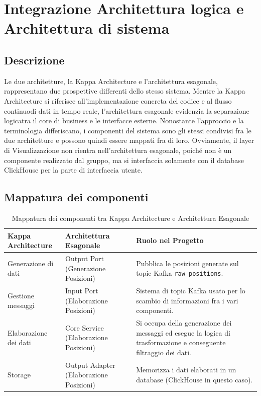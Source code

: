 \documentclass[10pt]{article}
\begin{document}
\section{Integrazione Architettura logica e Architettura di sistema}
\subsection{Descrizione}
Le due architetture, la Kappa Architecture e l'architettura esagonale, rappresentano due prospettive differenti dello stesso sistema.
Mentre la Kappa Architecture si riferisce all’implementazione concreta del codice e al flusso continuodi dati in tempo reale, l’architettura esagonale evidenzia la separazione logicatra il core di business e le interfacce esterne.
Nonostante l'approccio e la terminologia differiscano, i componenti  del sistema sono gli stessi condivisi fra le due architetture e possono quindi essere mappati fra di loro.
Ovviamente, il layer di Visualizzazione non rientra nell'architettura esagonale, poiché non è un componente realizzato dal gruppo, ma si interfaccia solamente con il database ClickHouse per la parte di interfaccia utente.
\subsection{Mappatura dei componenti}

\begin{table}[H]
\centering
\renewcommand{\arraystretch}{1.5}
\begin{tabular}{|>{\centering\arraybackslash}m{4cm}|>{\centering\arraybackslash}m{4cm}|>{\raggedright\arraybackslash}m{6cm}|}
\hline
\rowcolor{gray!25}
\textbf{Kappa Architecture} & \textbf{Architettura Esagonale} & \textbf{Ruolo nel Progetto} \\
\hline
Generazione di dati & Output Port (Generazione Posizioni) & Pubblica le posizioni generate sul topic Kafka \texttt{raw\_positions}. \\
\hline
Gestione messaggi & Input Port (Elaborazione Posizioni) & Sistema di topic Kafka usato per lo scambio di informazioni fra i vari componenti. \\
\hline
Elaborazione dei dati & Core Service (Elaborazione Posizioni) & Si occupa della generazione dei messaggi ed esegue la logica di trasformazione e conseguente filtraggio dei dati. \\
\hline
Storage & Output Adapter (Elaborazione Posizioni) & Memorizza i dati elaborati in un database (ClickHouse in questo caso). \\
\hline
\end{tabular}
\caption{Mappatura dei componenti tra Kappa Architecture e Architettura Esagonale}
\label{tab:mappatura_componenti}
\end{table}
\end{document}
